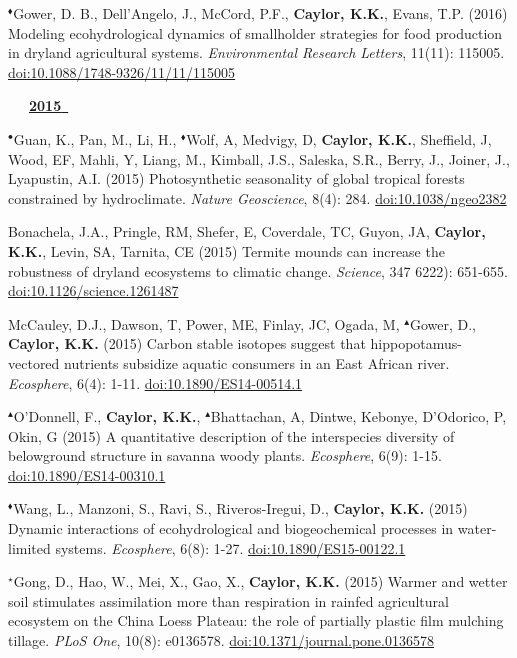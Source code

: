 \begin{etaremune}
\item $^{\blacklozenge}$Gower, D. B., Dell'Angelo, J., McCord, P.F., \textbf{ Caylor, K.K.}, Evans, T.P. (2016) Modeling ecohydrological dynamics of smallholder strategies for food production in dryland agricultural systems. \emph{Environmental Research Letters}, 11(11): 115005. \href{https://doi.org/10.1088/1748-9326/11/11/115005}{doi:10.1088/1748-9326/11/11/115005}

\vspace{0.1in}
\mbox{\ \ \ \underline{\textbf{2015 }}}
\vspace{0.1in}

\item $^{\bullet}$Guan, K., Pan, M., Li, H., $^{\blacklozenge}$Wolf, A, Medvigy, D, \textbf{ Caylor, K.K.}, Sheffield, J, Wood, EF, Mahli, Y, Liang, M., Kimball, J.S., Saleska, S.R., Berry, J., Joiner, J., Lyapustin, A.I. (2015) Photosynthetic seasonality of global tropical forests constrained by hydroclimate. \emph{Nature Geoscience}, 8(4): 284. \href{https://doi.org/10.1038/ngeo2382}{doi:10.1038/ngeo2382}
\item Bonachela, J.A., Pringle, RM, Shefer, E, Coverdale, TC, Guyon, JA, \textbf{ Caylor, K.K.}, Levin, SA, Tarnita, CE (2015) Termite mounds can increase the robustness of dryland ecosystems to climatic change. \emph{Science}, 347 6222): 651-655. \href{https://doi.org/10.1126/science.1261487}{doi:10.1126/science.1261487}
\item McCauley, D.J., Dawson, T, Power, ME, Finlay, JC, Ogada, M, $^{\blacktriangle}$Gower, D., \textbf{ Caylor, K.K.} (2015) Carbon stable isotopes suggest that hippopotamus-vectored nutrients subsidize aquatic consumers in an East African river. \emph{Ecosphere}, 6(4): 1-11. \href{https://doi.org/10.1890/ES14-00514.1}{doi:10.1890/ES14-00514.1}
\item $^{\blacktriangle}$O'Donnell, F., \textbf{ Caylor, K.K.}, $^{\blacktriangle}$Bhattachan, A, Dintwe, Kebonye, D'Odorico, P, Okin, G (2015) A quantitative description of the interspecies diversity of belowground structure in savanna woody plants. \emph{Ecosphere}, 6(9): 1-15. \href{https://doi.org/10.1890/ES14-00310.1}{doi:10.1890/ES14-00310.1}
\item $^{\blacklozenge}$Wang, L., Manzoni, S., Ravi, S., Riveros-Iregui, D., \textbf{ Caylor, K.K.} (2015) Dynamic interactions of ecohydrological and biogeochemical processes in water-limited systems. \emph{Ecosphere}, 6(8): 1-27. \href{https://doi.org/10.1890/ES15-00122.1}{doi:10.1890/ES15-00122.1}
\item $^{\star}$Gong, D., Hao, W., Mei, X., Gao, X., \textbf{ Caylor, K.K.} (2015) Warmer and wetter soil stimulates assimilation more than respiration in rainfed agricultural ecosystem on the China Loess Plateau: the role of partially plastic film mulching tillage. \emph{PLoS One}, 10(8): e0136578. \href{https://doi.org/10.1371/journal.pone.0136578}{doi:10.1371/journal.pone.0136578}

\end{etaremune}
